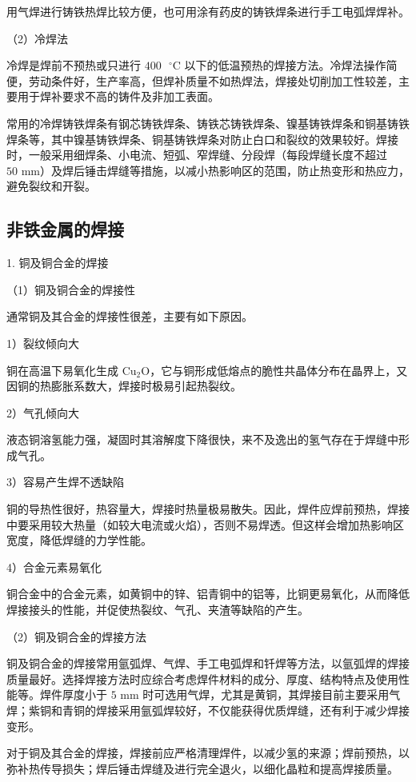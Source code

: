 \documentclass[UTF8]{ctexbook}
\newcommand{\◎}{\ensuremath{\bigcirc}}
\begin{document}
用气焊进行铸铁热焊比较方便，也可用涂有药皮的铸铁焊条进行手工电弧焊焊补。

（2）冷焊法

冷焊是焊前不预热或只进行 $400\text{ }^\circ\text{C}$ 以下的低温预热的焊接方法。冷焊法操作简便，劳动条件好，生产率高，但焊补质量不如热焊法，焊接处切削加工性较差，主要用于焊补要求不高的铸件及非加工表面。

常用的冷焊铸铁焊条有钢芯铸铁焊条、铸铁芯铸铁焊条、镍基铸铁焊条和铜基铸铁焊条等，其中镍基铸铁焊条、铜基铸铁焊条对防止白口和裂纹的效果较好。焊接时，一般采用细焊条、小电流、短弧、窄焊缝、分段焊（每段焊缝长度不超过 $50\text{ mm}$）及焊后锤击焊缝等措施，以减小热影响区的范围，防止热变形和热应力，避免裂纹和开裂。

\subsection{非铁金属的焊接}

1. 铜及铜合金的焊接

（1）铜及铜合金的焊接性

通常铜及其合金的焊接性很差，主要有如下原因。

1）裂纹倾向大

铜在高温下易氧化生成 $\text{Cu}_2\text{O}$，它与铜形成低熔点的脆性共晶体分布在晶界上，又因铜的热膨胀系数大，焊接时极易引起热裂纹。

2）气孔倾向大

液态铜溶氢能力强，凝固时其溶解度下降很快，来不及逸出的氢气存在于焊缝中形成气孔。

3）容易产生焊不透缺陷

铜的导热性很好，热容量大，焊接时热量极易散失。因此，焊件应焊前预热，焊接中要采用较大热量（如较大电流或火焰），否则不易焊透。但这样会增加热影响区宽度，降低焊缝的力学性能。

4）合金元素易氧化

铜合金中的合金元素，如黄铜中的锌、铝青铜中的铝等，比铜更易氧化，从而降低焊接接头的性能，并促使热裂纹、气孔、夹渣等缺陷的产生。

（2）铜及铜合金的焊接方法

铜及铜合金的焊接常用氩弧焊、气焊、手工电弧焊和钎焊等方法，以氩弧焊的焊接质量最好。选择焊接方法时应综合考虑焊件材料的成分、厚度、结构特点及使用性能等。焊件厚度小于 $5\text{ mm}$ 时可选用气焊，尤其是黄铜，其焊接目前主要采用气焊；紫铜和青铜的焊接采用氩弧焊较好，不仅能获得优质焊缝，还有利于减少焊接变形。

对于铜及其合金的焊接，焊接前应严格清理焊件，以减少氢的来源；焊前预热，以弥补热传导损失；焊后锤击焊缝及进行完全退火，以细化晶粒和提高焊接质量。
\end{document}
